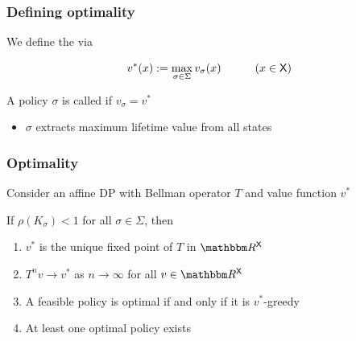 \documentclass[dvipsnames]{beamer}
\begin{document}
\begin{frame}
    \frametitle{Defining optimality}
    
    We define the   via
    
    \begin{equation*}
        v^*(x) := \max_{\sigma \in \Sigma} v_\sigma(x)
        \quad \qquad (x \in \mathsf X)
    \end{equation*}

    \vspace{0.4em}
    \vspace{0.4em}


    \vspace{0.4em}
    \vspace{0.4em}
    \vspace{0.4em}
    \vspace{0.4em}
    A policy $\sigma$ is called  if $v_\sigma = v^*$


    \begin{itemize}
        \item $\sigma$ extracts maximum lifetime value from all states
    \end{itemize}

\end{frame}




\begin{frame}
    \frametitle{Optimality}

    Consider an affine DP with Bellman operator $T$ and value function $v^*$
    \medskip

    \Thm If $\rho(K_\sigma) < 1$ for all $\sigma \in \Sigma$, then
    \begin{enumerate}
        \item $v^*$ is the unique fixed point of $T$
            in $\RR^\Xsf$
        \vspace{0.5em}
        \vspace{0.5em}
        \item $T^n v \to v^*$ as $n \to \infty$ for all $v \in \RR^\Xsf$
        \vspace{0.5em}
        \vspace{0.5em}
        \item A feasible policy is optimal if and only if it is $v^*$-greedy
        \vspace{0.5em}
        \vspace{0.5em}
        \item At least one optimal policy exists
    \end{enumerate}


\end{frame}
\end{document}
